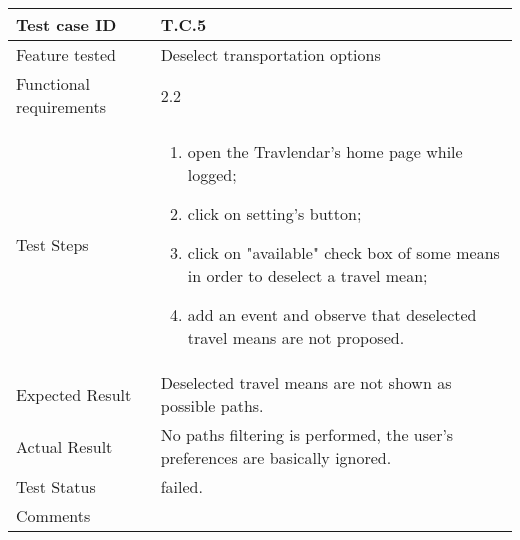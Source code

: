 \begin{table}[H]
	\begin{center}
		\begin{tabular}{ | p{} | p{} | }
		\hline
		Test case ID & T.C.5\\
		\hline
		Feature tested & Deselect transportation options  \\
		\hline
		Functional requirements & 2.2   \\
		\hline
		Test Steps & 
			\begin{enumerate}
				\item open the Travlendar's home page while logged;
				\item click on setting's button;
				\item click on "available" check box of some means in order to deselect a travel mean;
				\item add an event and observe that deselected travel means are not proposed.
			\end{enumerate} \\
		\hline
		Expected Result & Deselected travel means are not shown as possible paths.\\
		\hline
		Actual Result & No paths filtering is performed, the user's preferences are basically ignored.\\ 
		\hline
		Test Status & \color{Red}failed.\\ 
		\hline
		Comments &\\ 
		\hline
		\end{tabular}
	\end{center}
\end{table}

